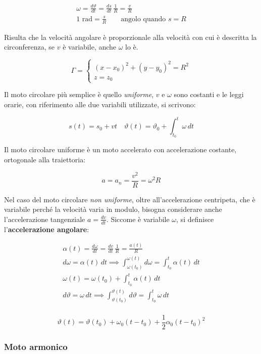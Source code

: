 \begin{gather*}
	\omega=\frac{d\vartheta}{dt}=\frac{ds}{dt}\,\frac{1}{R}=\frac{v}{R}\\
	1 \text{ rad}=\frac{s}{R} \qquad \text{angolo quando $s=R$}
\end{gather*}

Risulta che la velocità angolare è proporzionale alla velocità con cui è descritta la circonferenza, se $v$ è variabile, anche $\omega$ lo è.

\[
	\Gamma=
	\begin{cases}
		(x-x_0)^2+(y-y_0)^2=R^2 \\
		z=z_0
	\end{cases}
\]

Il moto circolare più semplice è quello \emph{uniforme}, $v$ e $\omega$ sono costanti e le leggi orarie, con riferimento alle due variabili utilizzate, si scrivono:

\[
	s(t)=s_0+vt \quad \vartheta(t)=\vartheta_0+\int^t_{t_0} \omega\,dt
\]

Il moto circolare uniforme è un moto accelerato con accelerazione costante, ortogonale alla traiettoria:

\[
	a=a_n=\frac{v^2}{R}=\omega^2 R
\]

Nel caso del moto circolare \emph{non uniforme}, oltre all'accelerazione centripeta, che è variabile perché la velocità varia in modulo, bisogna considerare anche l'accelerazione tangenziale $a = \frac{dv}{dt}$. Siccome è variabile $\omega$, si definisce l'\textbf{accelerazione angolare}:

\begin{gather*}
	\alpha(t)=\frac{d\omega}{dt}=\frac{dv}{dt}\,\frac{1}{R}= \frac{a(t)}{R} \\
	d\omega=\alpha(t) \,dt \implies \int^{\omega(t)}_{\omega(t_0)} d\omega=\int^t_{t_0} \alpha(t)\,dt \\
	\omega(t)=\omega(t_0)+\int^t_{t_0}\alpha(t)\,dt \\
	d\vartheta=\omega\,dt \implies \int^{\vartheta(t)}_{\vartheta(t_0)} d\vartheta =\int^t_{t_0}\omega\,dt \\
\end{gather*}

\begin{equation}
	\boxed{\vartheta(t)=\vartheta(t_0)+\omega_0(t-t_0)+\frac{1}{2}\alpha_0(t-t_0)^2}
\end{equation}

\subsubsection{Moto armonico}

